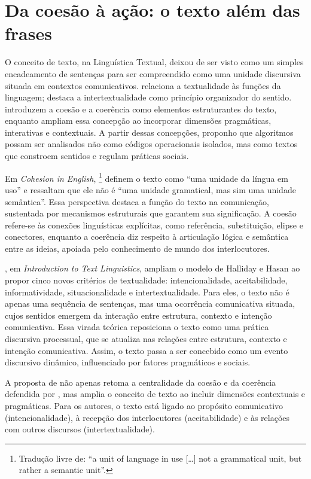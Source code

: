 \documentclass[portuguese]{textolivre}
\begin{document}
\section{Da coesão à ação: o texto além das frases}\label{sec-fmt-manuscrito}
O conceito de texto, na Linguística Textual, deixou de ser visto como um simples encadeamento de sentenças para ser compreendido como uma unidade discursiva situada em contextos comunicativos. \textcite{jakobson1960} relaciona a textualidade às funções da linguagem; \textcite{barthes1978} destaca a intertextualidade como princípio organizador do sentido. \textcite{halliday1976} introduzem a coesão e a coerência como elementos estruturantes do texto, enquanto \textcite{beaugrande1981} ampliam essa concepção ao incorporar dimensões pragmáticas, interativas e contextuais. A partir dessas concepções, proponho que algoritmos possam ser analisados não como códigos operacionais isolados, mas como textos que constroem sentidos e regulam práticas sociais.

Em \textit{Cohesion in English}, \textcite[p. 1, tradução nossa]{halliday1976}\footnote{Tradução livre de: “a unit of language in use […] not a grammatical unit, but rather a semantic unit”.} definem o texto como “uma unidade da língua em uso” e ressaltam que ele não é “uma unidade gramatical, mas sim uma unidade semântica”. Essa perspectiva destaca a função do texto na comunicação, sustentada por mecanismos estruturais que garantem sua significação. A coesão refere-se às conexões linguísticas explícitas, como referência, substituição, elipse e conectores, enquanto a coerência diz respeito à articulação lógica e semântica entre as ideias, apoiada pelo conhecimento de mundo dos interlocutores.

\textcite{beaugrande1981}, em \textit{Introduction to Text Linguistics}, ampliam o modelo de Halliday e Hasan ao propor cinco novos critérios de textualidade: intencionalidade, aceitabilidade, informatividade, situacionalidade e intertextualidade. Para eles, o texto não é apenas uma sequência de sentenças, mas uma ocorrência comunicativa situada, cujos sentidos emergem da interação entre estrutura, contexto e intenção comunicativa. Essa virada teórica reposiciona o texto como uma prática discursiva processual, que se atualiza nas relações entre estrutura, contexto e intenção comunicativa. Assim, o texto passa a ser concebido como um evento discursivo dinâmico, influenciado por fatores pragmáticos e sociais.

A proposta de \textcite{beaugrande1981} não apenas retoma a centralidade da coesão e da coerência defendida por \textcite{halliday1976}, mas amplia o conceito de texto ao incluir dimensões contextuais e pragmáticas. Para os autores, o texto está ligado ao propósito comunicativo (intencionalidade), à recepção dos interlocutores (aceitabilidade) e às relações com outros discursos (intertextualidade).
\end{document}
